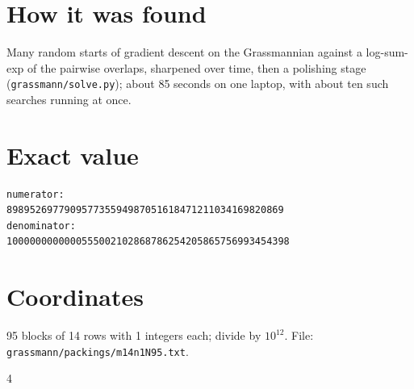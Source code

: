 \documentclass[11pt,a4paper]{article}
\begin{document}
\section{How it was found}
Many random starts of gradient descent on the Grassmannian against a log-sum-exp of the pairwise overlaps, sharpened over time, then a polishing stage (\texttt{grassmann/solve.py}); about 85 seconds on one laptop, with about ten such searches running at once.


\appendix
\section{Exact value}
{\small
\begin{verbatim}
numerator:
898952697790957735594987051618471211034169820869
denominator:
1000000000000555002102868786254205865756993454398
\end{verbatim}}

\section{Coordinates}
95 blocks of 14 rows with 1 integers each; divide by $10^{12}$. File: \texttt{grassmann/packings/m14n1N95.txt}.
{\tiny
\begin{multicols}{4}
\end{multicols}}
\end{document}
